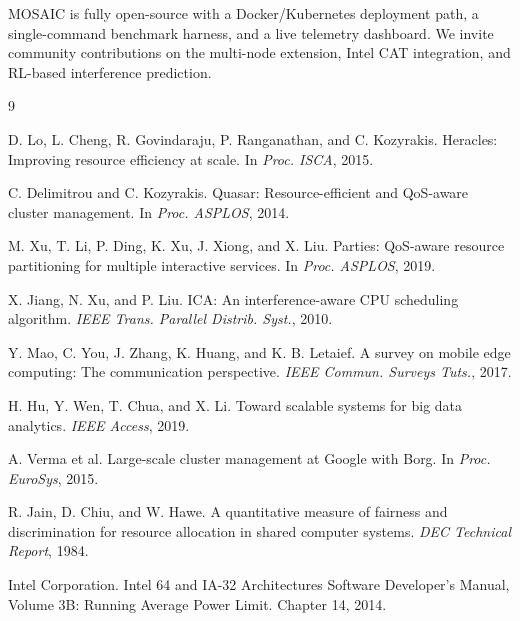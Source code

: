 \documentclass[sigconf,10pt]{acmart}
\newcommand{\sys}{MOSAIC\xspace}
\begin{document}
\sys is fully open-source with a Docker/Kubernetes deployment path,
a single-command benchmark harness, and a live telemetry dashboard.
We invite community contributions on the multi-node extension,
Intel CAT integration, and RL-based interference prediction.


\begin{thebibliography}{9}

D. Lo, L. Cheng, R. Govindaraju, P. Ranganathan, and C. Kozyrakis.
Heracles: Improving resource efficiency at scale.
In \emph{Proc. ISCA}, 2015.

C. Delimitrou and C. Kozyrakis.
Quasar: Resource-efficient and QoS-aware cluster management.
In \emph{Proc. ASPLOS}, 2014.

M. Xu, T. Li, P. Ding, K. Xu, J. Xiong, and X. Liu.
Parties: QoS-aware resource partitioning for multiple interactive services.
In \emph{Proc. ASPLOS}, 2019.

X. Jiang, N. Xu, and P. Liu.
ICA: An interference-aware CPU scheduling algorithm.
\emph{IEEE Trans. Parallel Distrib. Syst.}, 2010.

Y. Mao, C. You, J. Zhang, K. Huang, and K. B. Letaief.
A survey on mobile edge computing: The communication perspective.
\emph{IEEE Commun. Surveys Tuts.}, 2017.

H. Hu, Y. Wen, T. Chua, and X. Li.
Toward scalable systems for big data analytics.
\emph{IEEE Access}, 2019.

A. Verma et al.
Large-scale cluster management at Google with Borg.
In \emph{Proc. EuroSys}, 2015.

R. Jain, D. Chiu, and W. Hawe.
A quantitative measure of fairness and discrimination for resource
allocation in shared computer systems.
\emph{DEC Technical Report}, 1984.

Intel Corporation.
Intel 64 and IA-32 Architectures Software Developer's Manual,
Volume 3B: Running Average Power Limit.
Chapter 14, 2014.

\end{thebibliography}
\end{document}
